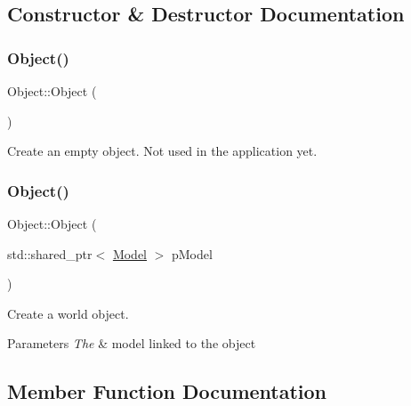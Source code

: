 \subsection{Constructor \& Destructor Documentation}
\mbox{\label{classObject_a40860402e64d8008fb42329df7097cdb}} 
\subsubsection{\texorpdfstring{Object()}{Object()}\hspace{0.1cm}{\footnotesize\ttfamily [1/2]}}
{\footnotesize\ttfamily Object\+::\+Object (\begin{DoxyParamCaption}{ }\end{DoxyParamCaption})}



Create an empty object. Not used in the application yet. 

\mbox{\label{classObject_a30ff0733f6b70bc1037d58b927237a0c}} 
\subsubsection{\texorpdfstring{Object()}{Object()}\hspace{0.1cm}{\footnotesize\ttfamily [2/2]}}
{\footnotesize\ttfamily Object\+::\+Object (\begin{DoxyParamCaption}\item[{std\+::shared\+\_\+ptr$<$ \hyperlink{classModel}{Model} $>$}]{p\+Model }\end{DoxyParamCaption})}



Create a world object. 


\begin{DoxyParams}{Parameters}
{\em The} & model linked to the object \\
\hline
\end{DoxyParams}


\subsection{Member Function Documentation}
\mbox{\label{classObject_ad9684af664b6b318174bb147d88131fe}} 
